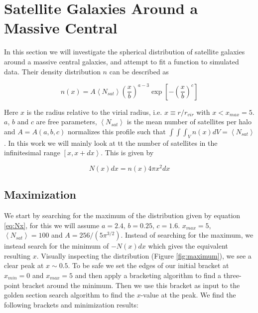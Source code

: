 \section{Satellite Galaxies Around a Massive Central}

In this section we will investigate the spherical distribution of satellite galaxies around a massive central galaxies, and attempt to  fit a function to simulated data. Their density distribution $n$ can be described as

\begin{equation}
    n(x) = A\left<N_{sat}\right>\left(\frac{x}{b}\right)^{a-3}\exp{\left[-\left(\frac{x}{b}\right)^{c}\right]}\label{eq:nx}
\end{equation}

Here $x$ is the radius relative to the virial radius, i.e. $x \equiv r/r_{vir}$ with $x < x_{max} = 5$. $a$, $b$ and $c$ are free parameters, $\left<N_{sat}\right>$ is the mean number of satellites per halo and $A = A(a,b,c)$ normalizes this profile such that $\int\int\int_V n(x)dV = \left<N_{sat}\right>$. In this work we will mainly look at tt the number of satellites in the infinitesimal range $\left[x, x+dx\right>$. This is given by

\begin{equation}
    N(x)dx = n(x)4\pi x^2dx\label{eq:Nx}
\end{equation}


\subsection{Maximization}\label{sec:maxi}

We start by searching for the maximum of the distribution given by equation \ref{eq:Nx}, for this we will assume $a=2.4$, $b=0.25$, $c=1.6$. $x_{max}=5$, $\left<N_{sat}\right>=100$ and $A=256/(5\pi^{3/2})$. Instead of searching for the maximum, we instead search for the minimum of $-N(x)dx$ which gives the equivalent resulting $x$. Visually inspecting the distribution (Figure \ref{fig:maximum}), we see a clear peak at $x \sim 0.5$. To be safe we set the edges of our initial bracket at $x_{min} = 0$ and $x_{max} = 5$ and then apply a bracketing algorithm to find a three-point bracket around the minimum. Then we use this bracket as input to the golden section search algorithm to find the $x$-value at the peak. We find the following brackets and minimization results:  



